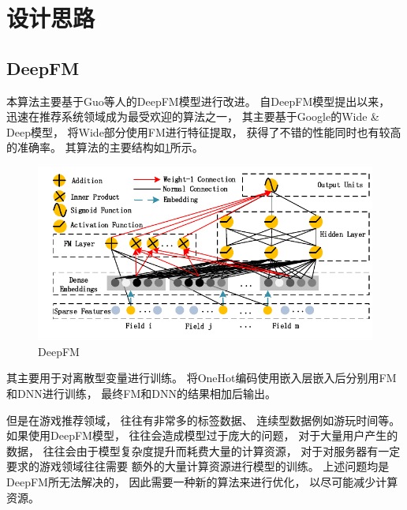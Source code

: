 \section{设计思路}

\subsection{DeepFM}

本算法主要基于Guo等人的DeepFM模型\cite{guoDeepFMFactorizationMachineBased2017}进行改进。
自DeepFM模型提出以来，
迅速在推荐系统领域成为最受欢迎的算法之一，
其主要基于Google的Wide \& Deep模型，
将Wide部分使用FM进行特征提取，
获得了不错的性能同时也有较高的准确率。
其算法的主要结构如\cref{fig:deepfm}所示。

\begin{figure}[!htbp]
	\centering
	\includegraphics[width=.9\textwidth]{images/architecture-deepfm.pdf}
	\caption{DeepFM}\label{fig:deepfm}
\end{figure}

其主要用于对离散型变量进行训练。
将OneHot编码使用嵌入层嵌入后分别用FM和DNN进行训练，
最终FM和DNN的结果相加后输出。

但是在游戏推荐领域，
往往有非常多的标签数据、
连续型数据例如游玩时间等。
如果使用DeepFM模型，
往往会造成模型过于庞大的问题，
对于大量用户产生的数据，
往往会由于模型复杂度提升而耗费大量的计算资源，
对于对服务器有一定要求的游戏领域往往需要
额外的大量计算资源进行模型的训练。
上述问题均是DeepFM所无法解决的，
因此需要一种新的算法来进行优化，
以尽可能减少计算资源。

